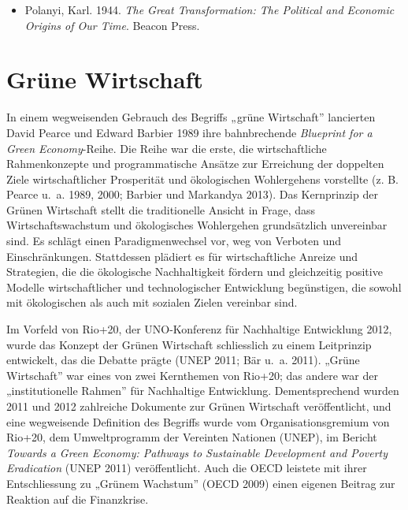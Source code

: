 \documentclass[
  nswissgerman,
  a4paper,
  openany]{book}
\providecommand{\tightlist}{%
  \setlength{\itemsep}{0pt}\setlength{\parskip}{0pt}}
\begin{document}
\begin{tcolorbox}[enhanced jigsaw, arc=.35mm, bottomrule=.15mm, bottomtitle=1mm, breakable, colback=white, colbacktitle=quarto-callout-caution-color!10!white, colframe=quarto-callout-caution-color-frame, coltitle=black, left=2mm, leftrule=.75mm, opacityback=0, opacitybacktitle=0.6, rightrule=.15mm, title={Weiterführende Literatur}, titlerule=0mm, toprule=.15mm, toptitle=1mm]

\begin{itemize}
\tightlist
\item
  Polanyi, Karl. 1944. \emph{The Great Transformation: The Political and
  Economic Origins of Our Time}. Beacon Press.
\end{itemize}

\end{tcolorbox}

\section{Grüne Wirtschaft}\label{gruxfcne-wirtschaft}

In einem wegweisenden Gebrauch des Begriffs „grüne Wirtschaft''
lancierten David Pearce und Edward Barbier 1989 ihre bahnbrechende
\emph{Blueprint for a Green Economy}-Reihe. Die Reihe war die erste, die
wirtschaftliche Rahmenkonzepte und programmatische Ansätze zur
Erreichung der doppelten Ziele wirtschaftlicher Prosperität und
ökologischen Wohlergehens vorstellte (z. B. Pearce u.~a. 1989, 2000;
Barbier und Markandya 2013). Das Kernprinzip der Grünen Wirtschaft
stellt die traditionelle Ansicht in Frage, dass Wirtschaftswachstum und
ökologisches Wohlergehen grundsätzlich unvereinbar sind. Es schlägt
einen Paradigmenwechsel vor, weg von Verboten und Einschränkungen.
Stattdessen plädiert es für wirtschaftliche Anreize und Strategien, die
die ökologische Nachhaltigkeit fördern und gleichzeitig positive Modelle
wirtschaftlicher und technologischer Entwicklung begünstigen, die sowohl
mit ökologischen als auch mit sozialen Zielen vereinbar sind.

Im Vorfeld von Rio+20, der UNO-Konferenz für Nachhaltige Entwicklung
2012, wurde das Konzept der Grünen Wirtschaft schliesslich zu einem
Leitprinzip entwickelt, das die Debatte prägte (UNEP 2011; Bär u.~a.
2011). „Grüne Wirtschaft'' war eines von zwei Kernthemen von Rio+20; das
andere war der „institutionelle Rahmen'' für Nachhaltige Entwicklung.
Dementsprechend wurden 2011 und 2012 zahlreiche Dokumente zur Grünen
Wirtschaft veröffentlicht, und eine wegweisende Definition des Begriffs
wurde vom Organisationsgremium von Rio+20, dem Umweltprogramm der
Vereinten Nationen (UNEP), im Bericht \emph{Towards a Green Economy:
Pathways to Sustainable Development and Poverty Eradication} (UNEP 2011)
veröffentlicht. Auch die OECD leistete mit ihrer Entschliessung zu
„Grünem Wachstum'' (OECD 2009) einen eigenen Beitrag zur Reaktion auf
die Finanzkrise.
\end{document}
